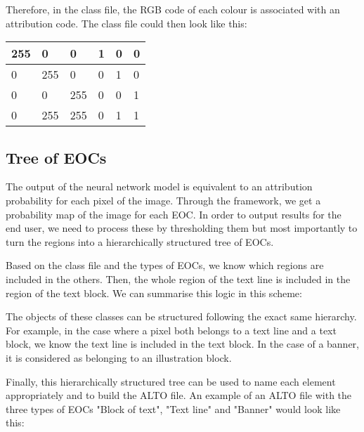 \documentclass{polytech/polytech}
\numberwithin{figure}{chapter}
\begin{document}
Therefore, in the class file, the RGB code of each colour is associated with an attribution code.
The class file could then look like this:
\begin{table}[]
\begin{tabular}{|llllll|}\hline
255 & 0 & 0 & 1 & 0 & 0\\\hline
0 & 255 & 0 & 0 & 1 & 0 \\\hline
0 & 0  & 255 & 0 & 0 & 1 \\\hline
0 & 255  &255 & 0 & 1 & 1 \\\hline
\end{tabular}
\end{table}


\subsection{Tree of EOCs}

The output of the neural network model is equivalent to an attribution probability for each pixel of the image.
Through the framework, we get a probability map of the image for each EOC.
In order to output results for the end user, we need to process these by thresholding them but most importantly to turn the regions into a hierarchically structured tree of EOCs.

Based on the class file and the types of EOCs, we know which regions are included in the others.
Then, the whole region of the text line is included in the region of the text block.
We can summarise this logic in this scheme:

\label{EOCdiag}

The objects of these classes can be structured following the exact same hierarchy.
For example, in the case where a pixel both belongs to a text line and a text block, we know the text line is included in the text block. In the case of a banner, it is considered as belonging to an illustration block.

Finally, this hierarchically structured tree can be used to name each element appropriately and to build the ALTO file.
An example of an ALTO file with the three types of EOCs "Block of text", "Text line" and "Banner" would look like this:
\end{document}
